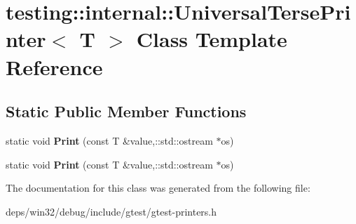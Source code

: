 \hypertarget{classtesting_1_1internal_1_1_universal_terse_printer}{}\section{testing\+:\+:internal\+:\+:Universal\+Terse\+Printer$<$ T $>$ Class Template Reference}
\label{classtesting_1_1internal_1_1_universal_terse_printer}
\subsection*{Static Public Member Functions}
\begin{DoxyCompactItemize}
\item 
\hypertarget{classtesting_1_1internal_1_1_universal_terse_printer_a2e16ee42c9b18fca397cd95f32e8e879}{}static void {\bfseries Print} (const T \&value,\+::std\+::ostream $\ast$os)\label{classtesting_1_1internal_1_1_universal_terse_printer_a2e16ee42c9b18fca397cd95f32e8e879}

\item 
\hypertarget{classtesting_1_1internal_1_1_universal_terse_printer_a2e16ee42c9b18fca397cd95f32e8e879}{}static void {\bfseries Print} (const T \&value,\+::std\+::ostream $\ast$os)\label{classtesting_1_1internal_1_1_universal_terse_printer_a2e16ee42c9b18fca397cd95f32e8e879}

\end{DoxyCompactItemize}


The documentation for this class was generated from the following file\+:\begin{DoxyCompactItemize}
\item 
deps/win32/debug/include/gtest/gtest-\/printers.\+h\end{DoxyCompactItemize}
